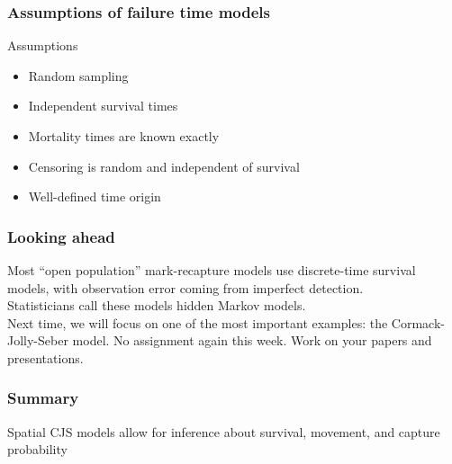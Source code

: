 \documentclass[color=usenames,dvipsnames]{beamer}\usepackage[]{graphicx}\usepackage[]{color}
\begin{document}
\begin{frame}
  \frametitle{Assumptions of failure time models}
  Assumptions
  \begin{itemize}
    \item Random sampling
    \item Independent survival times
    \item Mortality times are known exactly
    \item Censoring is random and independent of survival
    \item Well-defined time origin
  \end{itemize}
\end{frame}



\begin{frame}
  \frametitle{Looking ahead}
  Most ``open population'' mark-recapture models use discrete-time
  survival models, with observation error coming from imperfect
  detection. \\
  \pause
  \vfill
  Statisticians call these models hidden Markov models. \\
  \pause
  \vfill
  Next time, we will focus on one of the most important examples: the
  Cormack-Jolly-Seber model.
  \pause
  \vfill
  No assignment again this week. Work on your papers and
  presentations. 
\end{frame}









\begin{frame}
  \frametitle{Summary}
  \large
  Spatial CJS models allow for inference about survival,
  movement, and capture probability \\
\end{frame}



\end{document}
